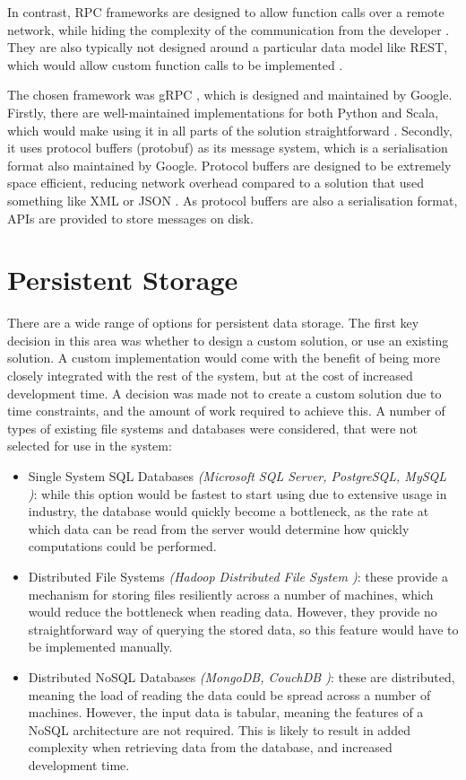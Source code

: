 In contrast, RPC frameworks are designed to allow function calls over a remote network, while hiding the complexity of the communication from the developer . They are also typically not designed around a particular data model like REST, which would allow custom function calls to  be implemented . 

The chosen framework was gRPC , which is designed and maintained by Google. Firstly, there are well-maintained implementations for both Python and Scala, which would make using it in all parts of the solution straightforward . Secondly, it uses protocol buffers (protobuf)  as its message system, which is a serialisation format also maintained by Google. Protocol buffers are designed to be extremely space efficient, reducing network overhead compared to a solution that used something like XML or JSON . As protocol buffers are also a serialisation format, APIs are provided to store messages on disk.


\section{Persistent Storage}
There are a wide range of options for persistent data storage. The first key decision in this area was whether to design a custom solution, or use an existing solution. A custom implementation would come with the benefit of being more closely integrated with the rest of the system, but at the cost of increased development time. A decision was made not to create a custom solution due to time constraints, and the amount of work required to achieve this. A number of types of existing file systems and databases were considered, that were not selected for use in the system:
\begin{itemize}
	\item Single System SQL Databases \textit{(Microsoft SQL Server, PostgreSQL, MySQL )}: while this option would be fastest to start using due to extensive   usage in industry, the database would quickly become a bottleneck, as the rate at which data can be read from the server would determine how quickly computations could be performed.
	\item Distributed File Systems \textit{(Hadoop Distributed File System )}: these provide a mechanism for storing files resiliently across a number of machines, which would reduce the bottleneck when reading data. However, they provide no straightforward way of querying the stored data, so this feature would have to be implemented manually.
	\item Distributed NoSQL Databases \textit{(MongoDB, CouchDB )}: these are distributed, meaning the load of reading the data could be spread across a number of machines. However, the input data is tabular, meaning the features of a NoSQL architecture are not required. This is likely to result in added complexity when retrieving data from the database, and increased development time.
\end{itemize}

